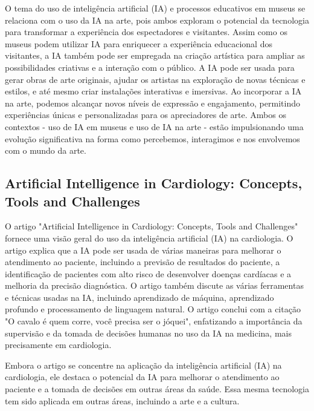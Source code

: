 \documentclass[12pt]{article}
\begin{document}
    O tema do uso de inteligência artificial (IA) e processos educativos em museus se relaciona com o uso da IA na arte, pois ambos exploram o potencial da tecnologia para transformar a experiência dos espectadores e visitantes. Assim como os museus podem utilizar IA para enriquecer a experiência educacional dos visitantes, a IA também pode ser empregada na criação artística para ampliar as possibilidades criativas e a interação com o público. A IA pode ser usada para gerar obras de arte originais, ajudar os artistas na exploração de novas técnicas e estilos, e até mesmo criar instalações interativas e imersivas. Ao incorporar a IA na arte, podemos alcançar novos níveis de expressão e engajamento, permitindo experiências únicas e personalizadas para os apreciadores de arte. Ambos os contextos - uso de IA em museus e uso de IA na arte - estão impulsionando uma evolução significativa na forma como percebemos, interagimos e nos envolvemos com o mundo da arte.


    \subsection{Artificial Intelligence in Cardiology: Concepts, Tools and Challenges}
	\label{sec:trab_relacionados}
    
    O artigo "Artificial Intelligence in Cardiology: Concepts, Tools and Challenges" fornece uma visão geral do uso da inteligência artificial (IA) na cardiologia. O artigo explica que a IA pode ser usada de várias maneiras para melhorar o atendimento ao paciente, incluindo a previsão de resultados do paciente, a identificação de pacientes com alto risco de desenvolver doenças cardíacas e a melhoria da precisão diagnóstica. O artigo também discute as várias ferramentas e técnicas usadas na IA, incluindo aprendizado de máquina, aprendizado profundo e processamento de linguagem natural. O artigo conclui com a citação "O cavalo é quem corre, você precisa ser o jóquei", enfatizando a importância da supervisão e da tomada de decisões humanas no uso da IA na medicina, mais precisamente em cardiologia.
    
    Embora o artigo se concentre na aplicação da inteligência artificial (IA) na cardiologia, ele destaca o potencial da IA para melhorar o atendimento ao paciente e a tomada de decisões em outras áreas da saúde. Essa mesma tecnologia tem sido aplicada em outras áreas, incluindo a arte e a cultura.
    
\end{document}
